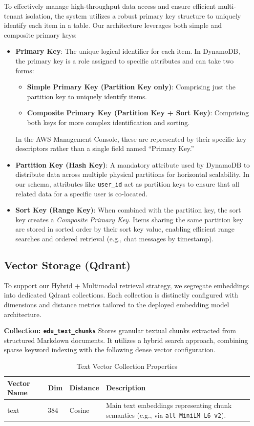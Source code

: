 To effectively manage high-throughput data access and ensure efficient multi-tenant isolation, the system utilizes a robust primary key structure to uniquely identify each item in a table. Our architecture leverages both simple and composite primary keys:
\begin{itemize}
    \item \textbf{Primary Key}: The unique logical identifier for each item. In DynamoDB, the primary key is a role assigned to specific attributes and can take two forms:
    \begin{itemize}
        \item \textbf{Simple Primary Key (Partition Key only)}: Comprising just the partition key to uniquely identify items.
        \item \textbf{Composite Primary Key (Partition Key + Sort Key)}: Comprising both keys for more complex identification and sorting.
    \end{itemize}
    In the AWS Management Console, these are represented by their specific key descriptors rather than a single field named ``Primary Key.''
    \item \textbf{Partition Key (Hash Key)}: A mandatory attribute used by DynamoDB to distribute data across multiple physical partitions for horizontal scalability. In our schema, attributes like \texttt{user\_id} act as partition keys to ensure that all related data for a specific user is co-located.
    \item \textbf{Sort Key (Range Key)}: When combined with the partition key, the sort key creates a \textit{Composite Primary Key}. Items sharing the same partition key are stored in sorted order by their sort key value, enabling efficient range searches and ordered retrieval (e.g., chat messages by timestamp).
\end{itemize}

\subsection{Vector Storage (Qdrant)}
To support our Hybrid + Multimodal retrieval strategy, we segregate embeddings into dedicated Qdrant collections. Each collection is distinctly configured with dimensions and distance metrics tailored to the deployed embedding model architecture.

\textbf{Collection: \texttt{edu\_text\_chunks}}
Stores granular textual chunks extracted from structured Markdown documents. It utilizes a hybrid search approach, combining sparse keyword indexing with the following dense vector configuration.
\begin{table}[H]
    \centering
    \begin{tabular}{lp{1cm}p{1.8cm}p{5.5cm}}
        \toprule
        \textbf{Vector Name} & \textbf{Dim} & \textbf{Distance} & \textbf{Description} \\
        \midrule
        text & 384 & Cosine & Main text embeddings representing chunk semantics (e.g., via \texttt{all-MiniLM-L6-v2}). \\
        \bottomrule
    \end{tabular}
    \caption{Text Vector Collection Properties}
    \label{tab:qdrant_text}
\end{table}

